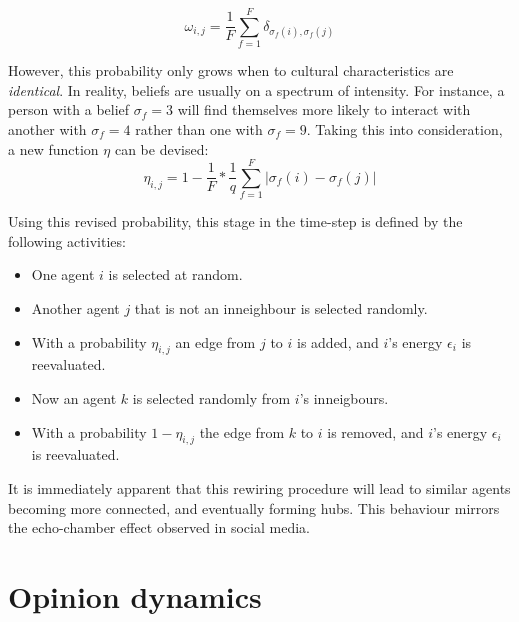 \documentclass[12pt,openright,twoside]{book}
\begin{document}
\begin{equation}
\omega_{i,j}=\frac{1}{F}\sum_{f=1}^{F}\delta_{\sigma_f(i),\sigma_f(j)}
\label{ax_trans_prob}
\end{equation}

\vspace{14pt}

However, this probability only grows when to cultural characteristics are \textit{identical}. In reality, beliefs are usually on a spectrum of intensity. For instance, a person with a belief $\sigma_f=3$ will find themselves more likely to interact with another with $\sigma_f=4$ rather than one with $\sigma_f=9$. Taking this into consideration, a new function $\eta$ can be devised:\\

\begin{equation}
\eta_{i,j}=1-\frac{1}{F}*\frac{1}{q}\sum_{f=1}^{F}|\sigma_f(i)-\sigma_f(j)|
\label{trans_prob}
\end{equation}

\vspace{14pt}

Using this revised probability, this stage in the time-step is defined by the following activities:\\

\begin{itemize}
    \item One agent $i$ is selected at random.
    \item Another agent $j$ that is not an inneighbour is selected randomly.
    \item With a probability $\eta_{i,j}$ an edge from $j$ to $i$ is added, and $i$'s energy $\epsilon_i$ is reevaluated.
    \item Now an agent $k$ is selected randomly from $i$'s inneigbours.
    \item With a probability $1-\eta_{i,j}$ the edge from $k$ to $i$ is removed, and $i$'s energy $\epsilon_i$ is reevaluated. 
\end{itemize}

\vspace{14pt}

It is immediately apparent that this rewiring procedure will lead to similar agents becoming more connected, and eventually forming hubs. This behaviour mirrors the echo-chamber effect observed in social media.\\

\section{Opinion dynamics}
\end{document}
